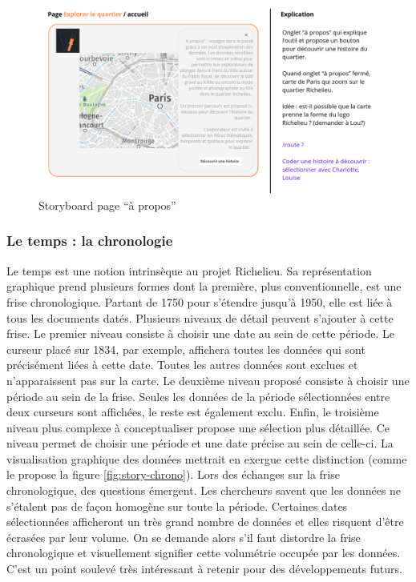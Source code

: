 \begin{figure}[h!]
    \centering
    \includegraphics[width=1\linewidth]{images/storyboard-apropos.png}
    \caption{Storyboard page \enquote{à propos}}
    \label{fig:story-propos}
\end{figure}

\subsubsection{Le temps : la chronologie}\label{sous-sous-section:chrono}
Le temps est une notion intrinsèque au projet Richelieu. Sa représentation graphique prend plusieurs formes dont la première, plus conventionnelle, est une frise chronologique. Partant de 1750 pour s'étendre jusqu'à 1950, elle est liée à tous les documents datés. Plusieurs niveaux de détail peuvent s'ajouter à cette frise. Le premier niveau consiste à choisir une date au sein de cette période. Le curseur placé sur 1834, par exemple, affichera toutes les données qui sont précisément liées à cette date. Toutes les autres données sont exclues et n'apparaissent pas sur la carte. Le deuxième niveau proposé consiste à choisir une période au sein de la frise. Seules les données de la période sélectionnées entre deux curseurs sont affichées, le reste est également exclu. Enfin, le troisième niveau plus complexe à conceptualiser propose une sélection plus détaillée. Ce niveau permet de choisir une période et une date précise au sein de celle-ci. La visualisation graphique des données mettrait en exergue cette distinction (comme le propose la figure \ref{fig:story-chrono}). 
Lors des échanges sur la frise chronologique, des questions émergent. Les chercheurs savent que les données ne s'étalent pas de façon homogène sur toute la période. Certaines dates sélectionnées afficheront un très grand nombre de données et elles risquent d'être écrasées par leur volume. On se demande alors s'il faut distordre la frise chronologique et visuellement signifier cette volumétrie occupée par les données. C'est un point soulevé très intéressant à retenir pour des développements futurs.

